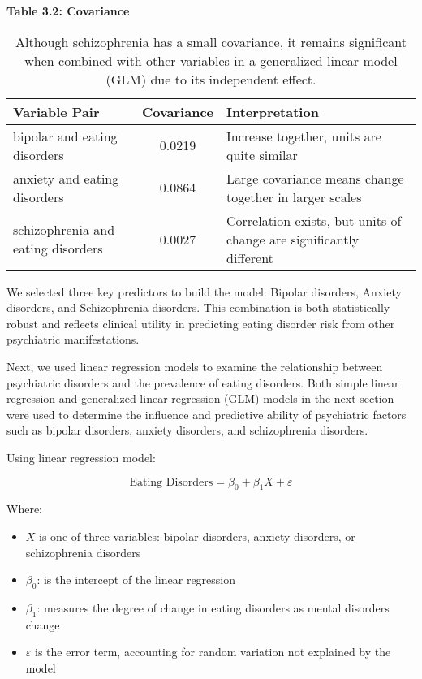 \begin{table}[h!]
\centering
\textbf{Table 3.2: Covariance}

\begin{tabular}{||p{5cm} c p{8cm}||} 
 \hline
 \textbf{Variable Pair} & \textbf{Covariance} & \textbf{Interpretation} \\ 
 \hline
 bipolar and eating disorders & 0.0219 & Increase together, units are quite similar \\ 
 \hline
 anxiety and eating disorders & 0.0864 & Large covariance means change together in larger scales \\
 \hline
 schizophrenia and eating disorders & 0.0027 & Correlation exists, but units of change are significantly different \\
 \hline
\end{tabular}
\caption{Although schizophrenia has a small covariance, it remains significant when combined with other variables in a generalized linear model (GLM) due to its independent effect.}
\label{table:3.2}
\end{table}

We selected three key predictors to build the model: Bipolar disorders, Anxiety disorders, and Schizophrenia disorders. This combination is both statistically robust and reflects clinical utility in predicting eating disorder risk from other psychiatric manifestations.

Next, we used linear regression models to examine the relationship between psychiatric disorders and the prevalence of eating disorders. Both simple linear regression and generalized linear regression (GLM) models in the next section were used to determine the influence and predictive ability of psychiatric factors such as bipolar disorders, anxiety disorders, and schizophrenia disorders.

Using linear regression model:

    \begin{equation}
    \text{Eating Disorders} = \beta_0 + \beta_1 X + \varepsilon
    \end{equation}
    
    Where:
    \begin{itemize}
    \item $X$ is one of three variables: bipolar disorders, anxiety disorders, or schizophrenia disorders
    \item $\beta_0$: is the intercept of the linear regression
    \item $\beta_1$: measures the degree of change in eating disorders as mental disorders change
    \item $\varepsilon$ is the error term, accounting for random variation not explained by the model
    \end{itemize}
    
